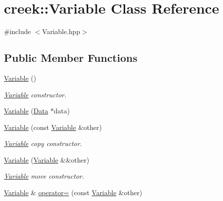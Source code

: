 \hypertarget{classcreek_1_1_variable}{}\section{creek\+:\+:Variable Class Reference}
\label{classcreek_1_1_variable}


{\ttfamily \#include $<$Variable.\+hpp$>$}

\subsection*{Public Member Functions}
\begin{DoxyCompactItemize}
\item 
\hyperlink{classcreek_1_1_variable_ac5419272358fcb48723be5320c3497d9}{Variable} ()\hypertarget{classcreek_1_1_variable_ac5419272358fcb48723be5320c3497d9}{}\label{classcreek_1_1_variable_ac5419272358fcb48723be5320c3497d9}

\begin{DoxyCompactList}\small\item\em {\ttfamily \hyperlink{classcreek_1_1_variable}{Variable}} constructor. \end{DoxyCompactList}\item 
\hyperlink{classcreek_1_1_variable_a19c57bef93c4bf23093a12abbe5b4cdd}{Variable} (\hyperlink{classcreek_1_1_data}{Data} $\ast$data)
\item 
\hyperlink{classcreek_1_1_variable_aaa2847b15502c7afd95bdbe497c5d238}{Variable} (const \hyperlink{classcreek_1_1_variable}{Variable} \&other)\hypertarget{classcreek_1_1_variable_aaa2847b15502c7afd95bdbe497c5d238}{}\label{classcreek_1_1_variable_aaa2847b15502c7afd95bdbe497c5d238}

\begin{DoxyCompactList}\small\item\em {\ttfamily \hyperlink{classcreek_1_1_variable}{Variable}} copy constructor. \end{DoxyCompactList}\item 
\hyperlink{classcreek_1_1_variable_a739a4806a470011252dd22b4e90dcfe2}{Variable} (\hyperlink{classcreek_1_1_variable}{Variable} \&\&other)\hypertarget{classcreek_1_1_variable_a739a4806a470011252dd22b4e90dcfe2}{}\label{classcreek_1_1_variable_a739a4806a470011252dd22b4e90dcfe2}

\begin{DoxyCompactList}\small\item\em {\ttfamily \hyperlink{classcreek_1_1_variable}{Variable}} move constructor. \end{DoxyCompactList}\item 
\hyperlink{classcreek_1_1_variable}{Variable} \& \hyperlink{classcreek_1_1_variable_a18aa19a8eb10800d0b84f3d8f879fe79}{operator=} (const \hyperlink{classcreek_1_1_variable}{Variable} \&other)\hypertarget{classcreek_1_1_variable_a18aa19a8eb10800d0b84f3d8f879fe79}{}\label{classcreek_1_1_variable_a18aa19a8eb10800d0b84f3d8f879fe79}


\end{DoxyCompactItemize}
